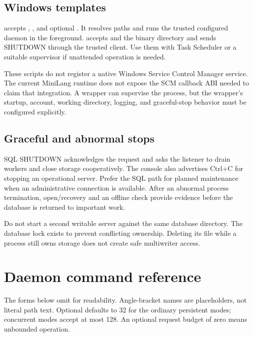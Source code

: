 \subsection{Windows templates}

 accepts
, , and optional
. It resolves paths and runs the trusted configured
daemon in the foreground.  accepts 
and the binary directory and sends SHUTDOWN through the trusted client.
Use them with Task Scheduler or a suitable supervisor if unattended operation
is needed.

These scripts do not register a native Windows Service Control Manager
service. The current MiniLang runtime does not expose the SCM callback ABI
needed to claim that integration. A wrapper can supervise the process, but
the wrapper's startup, account, working directory, logging, and graceful-stop
behavior must be configured explicitly.

\subsection{Graceful and abnormal stops}

SQL SHUTDOWN acknowledges the request and asks the listener to drain workers
and close storage cooperatively. The console also advertises Ctrl+C for
stopping an operational server. Prefer the SQL path for planned maintenance
when an administrative connection is available. After an abnormal process
termination, open/recovery and an offline check provide evidence before the
database is returned to important work.

Do not start a second writable server against the same database directory.
The database lock exists to prevent conflicting ownership. Deleting its file
while a process still owns storage does not create safe multiwriter access.


\section{Daemon command reference}

The forms below omit  for readability. Angle-bracket names are
placeholders, not literal path text. Optional  defaults to
32 for the ordinary persistent modes; concurrent modes accept at most 128.
An optional request budget of zero means unbounded operation.

